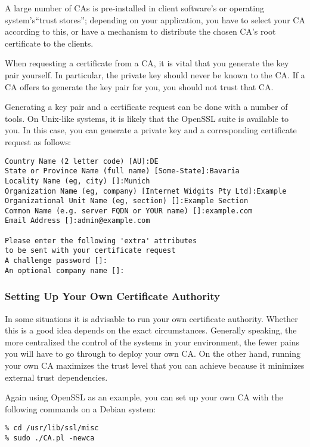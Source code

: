 A large number of CAs is pre-installed in client software's or
operating system's``trust stores''; depending on your application, you
have to select your CA according to this, or have a mechanism to
distribute the chosen CA's root certificate to the clients.

When requesting a certificate from a CA, it is vital that you generate the
key pair yourself.  In particular, the private key should never be known to
the CA.  If a CA offers to generate the key pair for you, you should not
trust that CA.

Generating a key pair and a certificate request can be done with a number of
tools.  On Unix-like systems, it is likely that the OpenSSL suite is available
to you.  In this case, you can generate a private key and a corresponding
certificate request as follows:

\begin{lstlisting}[breaklines]
% openssl req -new -nodes -keyout <servername>.key -out <servername>.csr -newkey rsa:<keysize>
Country Name (2 letter code) [AU]:DE
State or Province Name (full name) [Some-State]:Bavaria
Locality Name (eg, city) []:Munich
Organization Name (eg, company) [Internet Widgits Pty Ltd]:Example
Organizational Unit Name (eg, section) []:Example Section
Common Name (e.g. server FQDN or YOUR name) []:example.com
Email Address []:admin@example.com

Please enter the following 'extra' attributes
to be sent with your certificate request
A challenge password []:
An optional company name []:
\end{lstlisting}

\subsubsection{Setting Up Your Own Certificate Authority}
\label{sec:setupownca}
In some situations it is advisable to run your own certificate authority.
Whether this is a good idea depends on the exact circumstances.  Generally
speaking, the more centralized the control of the systems in your
environment, the fewer pains you will have to go through to deploy your own
CA.  On the other hand, running your own CA maximizes the trust level that
you can achieve because it minimizes external trust dependencies.

Again using OpenSSL as an example, you can set up your own CA with the
following commands on a Debian system:

\begin{lstlisting}
% cd /usr/lib/ssl/misc
% sudo ./CA.pl -newca
\end{lstlisting}

